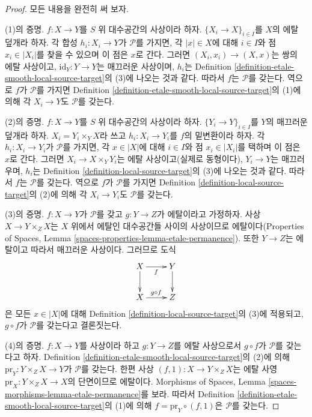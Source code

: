 \begin{proof}
모든 내용을 완전히 써 보자.

\medskip\noindent
(1)의 증명. $f:X\to Y$를 $S$ 위 대수공간의 사상이라 하자.
$\{X_i\to X\}_{i\in I}$를 $X$의 에탈 덮개라 하자. 각 합성
$h_i:X_i\to Y$가 $\mathcal{P}$를 가지면, 각
$|x|\in X$에 대해 $i\in I$와 점 $x_i\in|X_i|$를 찾을 수 있으며 이 점은
$x$로 간다. 그러면 $(X_i,x_i)\to(X,x)$는 쌍의 에탈 사상이고,
$\text{id}_Y:Y\to Y$는 매끄러운 사상이며, $h_i$는 Definition
\ref{definition-etale-smooth-local-source-target}의 (3)에 나오는 것과 같다.
따라서 $f$는 $\mathcal{P}$를 갖는다. 역으로 $f$가 $\mathcal{P}$를 가지면
Definition \ref{definition-etale-smooth-local-source-target}의 (1)에 의해
각 $X_i\to Y$도 $\mathcal{P}$를 갖는다.

\medskip\noindent
(2)의 증명. $f:X\to Y$를 $S$ 위 대수공간의 사상이라 하자.
$\{Y_i\to Y\}_{i\in I}$를 $Y$의 매끄러운 덮개라 하자.
$X_i=Y_i\times_YX$라 쓰고 $h_i:X_i\to Y_i$를 $f$의 밑변환이라 하자.
각 $h_i:X_i\to Y_i$가 $\mathcal{P}$를 가지면, 각 $x\in|X|$에 대해
$i\in I$와 점 $x_i\in|X_i|$를 택하며 이 점은 $x$로 간다. 그러면
$X_i\to X\times_YY_i$는 에탈 사상이고(실제로 동형이다), $Y_i\to Y$는
매끄러우며, $h_i$는
Definition \ref{definition-local-source-target}의 (3)에 나오는 것과 같다.
따라서 $f$는 $\mathcal{P}$를 갖는다. 역으로 $f$가 $\mathcal{P}$를 가지면
Definition \ref{definition-local-source-target}의 (2)에 의해 각
$X_i\to Y_i$도 $\mathcal{P}$를 갖는다.

\medskip\noindent
(3)의 증명. $f:X\to Y$가 $\mathcal{P}$를 갖고 $g:Y\to Z$가 에탈이라고
가정하자. 사상 $X\to Y\times_ZX$는 $X$ 위에서 에탈인 대수공간들
사이의 사상이므로 에탈이다(Properties of Spaces, Lemma
\ref{spaces-properties-lemma-etale-permanence}). 또한 $Y\to Z$는
에탈이고 따라서 매끄러운 사상이다.
그러므로 도식
$$
\xymatrix{
X \ar[d] \ar[r]_f & Y \ar[d] \\
X \ar[r]^{g \circ f} & Z
}
$$
은 모든 $x\in|X|$에 대해
Definition \ref{definition-local-source-target}의 (3)에 적용되고,
$g\circ f$가 $\mathcal{P}$를 갖는다고 결론짓는다.

\medskip\noindent
(4)의 증명. $f:X\to Y$를 사상이라 하고 $g:Y\to Z$를 에탈 사상으로서
$g\circ f$가 $\mathcal{P}$를 갖는다고 하자. Definition
\ref{definition-etale-smooth-local-source-target}의 (2)에 의해
$\text{pr}_Y:Y\times_ZX\to Y$가 $\mathcal{P}$를 갖는다. 한편 사상
$(f,1):X\to Y\times_ZX$는 에탈 사영
$\text{pr}_X:Y\times_ZX\to X$의 단면이므로 에탈이다. Morphisms of Spaces,
Lemma \ref{spaces-morphisms-lemma-etale-permanence}를 보라. 따라서 Definition
\ref{definition-etale-smooth-local-source-target}의 (1)에 의해
$f=\text{pr}_Y\circ(f,1)$은 $\mathcal{P}$를 갖는다.
\end{proof}


